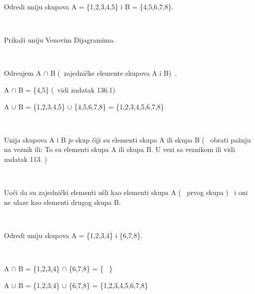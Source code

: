 \begin{zad}

    Odredi uniju skupova A = \{1,2,3,4,5\} i B = \{4,5,6,7,8\}. 

    \ 

    Prika\v zi uniju Venovim Dijagramima. 

    \ 

    

    Odre\dj ujem A $\cap$ B (\ zajedni\v cke elemente skupova A i B)\ . 



    A $\cap$ B = \{4,5\} (\ vidi zadatak 136.1)

    

    \begin{figure}[h] 

        \center


        \caption{}

    \end{figure}



    A $\cup$ B = \{1,2,3,4,5\} $\cup$ \{4,5,6,7,8\} = \{1,2,3,4,5,6,7,8\}

    \ 

    

    Unija skupova A i B je skup \v ciji su elementi skupa A ili skupa B ( \ obrati pa\v znju na veznik ili: To su elementi skupa  A ili skupa B. U vezi sa veznikom ili vidi zadatak 113. ) \

    \ 



    Uo\v ci da su zajedni\v cki elementi u\v sli kao elementi skupa A ( \ prvog skupa ) \, i oni ne ulaze kao elementi drugog skupa B. 

    \ 

    Odredi uniju skupova A = \{1,2,3,4\} i \{6,7,8\}. 

    \ 

    

    A $\cap$ B = \{1,2,3,4\} $\cap$ \{6,7,8\} = \{ \ \} 



 \begin{figure}[h] 

        \center


        \caption{}

\end{figure}





A $\cup$ B = \{1,2,3,4\} $\cup$ \{6,7,8\} = \{1,2,3,4,5,6,7,8\}

\

\end{zad}

